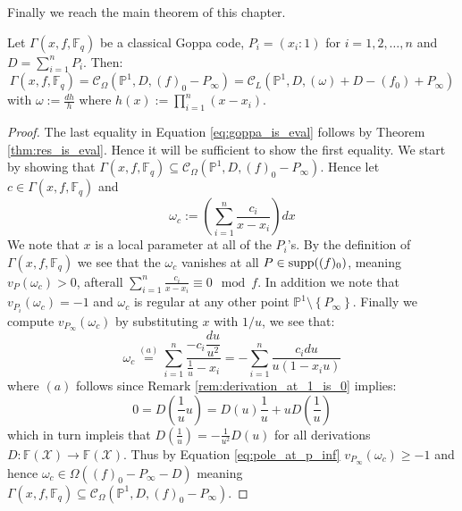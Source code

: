 Finally we reach the main theorem of this chapter.

\begin{theorem}\label{thm:classical_goppa_is_AG}
  Let $\Gamma(x, f, \mathbb{F}_q)$ be a classical Goppa code, $P_i = (x_i : 1)$ for $i = 1, 2, \ldots, n$ and $D = \sum_{i = 1}^n P_i$. Then:
  \begin{equation}\label{eq:goppa_is_eval}
    \Gamma(x, f, \mathbb{F}_q) = \mathcal{C}_{\Omega}(\mathbb{P}^1, D, (f)_{0} - P_{\infty}) = \mathcal{C}_L(\mathbb{P}^1, D, (\omega) + D - (f_0) + P_{\infty})
  \end{equation}
  with $\omega := \frac{dh}{h}$ where $h(x) := \prod^n_{i = 1} (x - x_{i})$.
\end{theorem}
\begin{proof}
  The last equality in Equation \eqref{eq:goppa_is_eval} follows by Theorem \ref{thm:res_is_eval}. Hence it will be sufficient to show the first equality. We start by showing that $\Gamma(x, f, \mathbb{F}_q) \subseteq \mathcal{C}_{\Omega}(\mathbb{P}^1, D, (f)_0 - P_{\infty})$. Hence let $c \in \Gamma(x, f, \mathbb{F}_q)$ and
  \begin{equation*}
    \omega_c := \left(\sum_{i=1}^n \frac{c_{i}}{x - x_{i}} \right) dx
  \end{equation*}
  We note that $x$ is a local parameter at all of the $P_i$'s. By the definition of $\Gamma(x, f, \mathbb{F}_q)$ we see that the $\omega_{c}$ vanishes at all $P \in \textnormal{supp}((f)_{0})$, meaning $v_P(\omega_c) > 0$, afterall $\sum_{i = 1}^n \frac{c_{i}}{x - x_i} \equiv 0 \mod f$. In addition we note that $v_{P_i}(\omega_c) = -1$ and $\omega_c$ is regular at any other point $\mathbb{P}^1 \setminus \left\{P_\infty\right\}$.
  Finally we compute $v_{P_\infty}(\omega_c)$ by substituting $x$ with $1/u$, we see that:
  \begin{equation}\label{eq:pole_at_p_inf}
    \omega_c \stackrel{(a)}{=} \sum_{i=1}^n  \frac{-c_{i} \dfrac{du}{u^{2}}}{\frac{1}{u} - x_i} = - \sum^n_{i = 1} \frac{c_{i} du}{u(1 - x_{i}u)}
  \end{equation}
  where $(a)$ follows since Remark \ref{rem:derivation_at_1_is_0} implies:
  \begin{equation*}
    0 = D \left(\frac{1}{u}u\right) = D(u)\frac{1}{u} + u D\left(\frac{1}{u}\right)
  \end{equation*}
  which in turn impleis that $D\left(\frac{1}{u}\right) = -\frac{1}{u^{2}} D(u)$ for all derivations $D: \mathbb{F}(\mathcal{X}) \to \mathbb{F}(\mathcal{X})$. Thus by Equation \eqref{eq:pole_at_p_inf} $v_{P_\infty}(\omega_{c}) \geq -1$ and hence $\omega_c \in \Omega((f)_0 - P_{\infty} - D)$ meaning $\Gamma(x, f, \mathbb{F}_q) \subseteq \mathcal{C}_{\Omega}(\mathbb{P}^1, D, (f)_0 - P_{\infty})$.

\end{proof}
